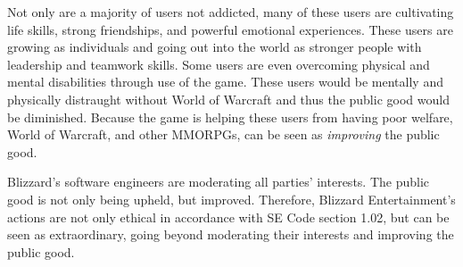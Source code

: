 \documentclass[11pt]{article}
\begin{document}
\begin{multicols}{2}
Not only are a majority of users not addicted, many of these users are cultivating life skills, strong friendships, and powerful emotional experiences. These users are growing as individuals and going out into the world as stronger people with leadership and teamwork skills.
Some users are even overcoming physical and mental disabilities through use of the game. These users would be mentally and physically distraught without World of Warcraft and thus the public good would be diminished. Because the game is helping these users from having poor welfare, World of Warcraft, and other MMORPGs, can be seen as \emph{improving} the public good.

Blizzard's software engineers are moderating all parties' interests. The public good is not only being upheld, but improved. Therefore, Blizzard Entertainment's actions are not only ethical in accordance with SE Code section 1.02, but can be seen as extraordinary, going beyond moderating their interests and improving the public good.

\end{multicols}
\newpage




\end{document}
